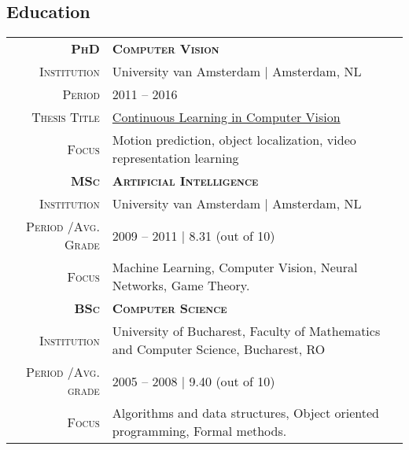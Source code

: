 \documentclass[a4paper, oneside, final]{scrartcl}
\newcommand{\gray}{\rowcolor[gray]{.90}}
\begin{document}
\begin{center}
		\section{Education}
		\begin{tabular}{r@{\hskip 0.3in}p{12.3cm}}
			\gray \textsc{\textbf{PhD}}     & \textbf{\textsc{Computer Vision}}\\ 
			\textsc{Institution}            & University van Amsterdam $\mid$ Amsterdam, NL\\
            \textsc{Period}                 & \textsc{2011 -- 2016}\\
			\textsc{Thesis Title}           & {\href{http://dare.uva.nl/search?identifier=90ad88f5-c16e-4450-86f2-23faa250fcab}{Continuous Learning in Computer Vision}}\\
			\textsc{Focus}                  & Motion prediction, object localization, video representation learning 
            \vspace{5px}\\
			\gray \textsc{\textbf{MSc}}         & \textbf{\textsc{Artificial Intelligence}}\\
			\textsc{Institution}                & University van Amsterdam $\mid$ Amsterdam, NL\\
			\textsc{Period \slash Avg. Grade}   & \textsc{2009  -- 2011} $|$ 8.31 (out of 10)\\
			\textsc{Focus}                      & Machine Learning, Computer Vision, Neural Networks, Game Theory.
            \vspace{5px}\\
			\gray \textsc{\textbf{BSc}}         & \textbf{\textsc{Computer Science}}\\
			\textsc{Institution}                & University of Bucharest, Faculty of Mathematics and Computer Science, Bucharest, RO\\
			\textsc{Period \slash Avg. grade}   & \textsc{2005 -- 2008} $|$ 9.40 (out of 10)\\
			\textsc{Focus}                      & Algorithms and data structures, Object oriented programming, Formal methods.\\ 
		\end{tabular}

\end{center}
\end{document}
